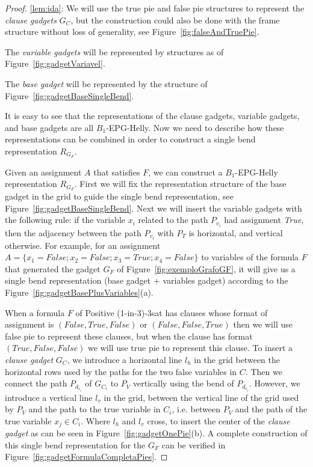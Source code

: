 \documentclass[runningheads]{llncs}
\begin{document}
\begin{proof}
\ref{lem:ida}:
We will use the true pie and false pie structures to represent the \textit{clause gadgets} $ G_C$, but the construction could also be done with the frame structure without loss of generality, see Figure~\ref{fig:falseAndTruePie}.  




The \textit{variable gadgets} will be represented by structures as of Figure~\ref{fig:gadgetVariavel}.




The \textit{base gadget} will be represented by the structure of Figure~\ref{fig:gadgetBaseSingleBend}.



It is easy to see that the representations of the clause gadgets, variable gadgets, and base gadgets are all $B_1$-EPG-Helly. Now we need to describe how these representations can be combined in order to construct a single bend representation $R_{G_F}$.

Given an assignment $A$ that satisfies $F$, we can construct a  $B_{1}$-EPG-Helly representation $R_{G_F}$. First we will fix the representation structure of the base gadget in the grid to guide the single bend representation, see Figure~\ref{fig:gadgetBaseSingleBend}. Next we will insert the variable gadgets with the following rule: if the  variable $x_i$ related to the path $P_{v_i}$ had assignment \textit{True}, then the adjacency between the path $P_{v_i}$ with $P_T$ is horizontal, and vertical otherwise. For example, for an assignment $A=\{x_1=False; x_2=False;x_3=True; x_4=False\}$  to variables of the formula $F$ that generated the gadget $G_F$ of Figure~\ref{fig:exemploGrafoGF}, it will give us a single bend representation (base gadget + variables gadget) according to the Figure~\ref{fig:gadgetBasePlusVariables}(a). 

 When a formula $F$ of {\sc Positive (1-in-3)-3sat} has clauses whose format of assignment is $(False, True, False)$ or $(False, False, True)$ then we will use false pie to represent these clauses, but when the clause has format $(True, False, False)$ we will use true pie to represent this clause. To insert a \textit{ clause gadget} $G_{C}$, we introduce a horizontal line $l_{h}$ in the grid between the horizontal rows used by the paths for the two false variables in $ C $. Then we connect the path $P_{d_{c_i}}$ of $G_{C_i}$ to $P_V$ vertically using the bend of $P_{d_{c_i}}$. However, we introduce a vertical line $ l_{v}$ in the grid, between the vertical line of the grid used by $P_V$ and the path to the true variable in $C_i$, i.e. between $P_V$ and the path of the true variable $x_j \in C_i$. Where $l_{h}$ and $l_{v}$ cross, to insert the center of the  \textit{clause gadget} as can be seen in Figure~\ref{fig:gadgetOnePie}(b). A complete construction of this single bend representation for the $G_F$ can be verified in 
Figure~\ref{fig:gadgetFormulaCompletaPies}.%


\end{proof}
\end{document}
